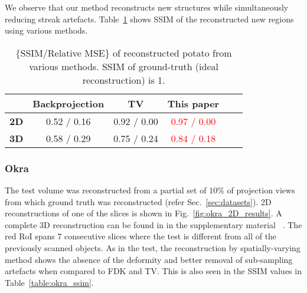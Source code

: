 \documentclass[journal]{IEEEtran}
\begin{document}
We observe
that our method reconstructs new structures while simultaneously
reducing streak artefacts. Table~\ref{table:potato_ssim} shows SSIM of
the reconstructed new regions using various methods.
\begin{comment}
\begin{figure}[!h]
\centering
\subcaptionbox{Test}{\fcolorbox{blue}{blue}{\texttt{[image: ../images/potato/post\_tci/6\_views/test\_zoomed.png]}}}
\subcaptionbox{FDK, no prior}{\texttt{[image: ../images/potato/post\_tci/6\_views/fbp\_zoomed.png]}}
\subcaptionbox{TV, no prior}{\texttt{[image: ../images/potato/post\_tci/6\_views/tv\_zoomed.png]}}
\subcaptionbox{This paper}{\texttt{[image: ../images/potato/post\_tci/6\_views/weighted\_pca\_zoomed.png]}}
\caption{A zoomed-in version of the regions around the RoI of the reconstructions shown in Fig.~\ref{fig:potato_2D_results}.}
\label{fig:potato_zoomed_2D_results}
\end{figure}
\end{comment}
\begin{table}[!h]
  \centering
  \caption{\{SSIM/Relative MSE\} of reconstructed potato from various
    methods. SSIM of ground-truth (ideal reconstruction) is 1.}
\begin{tabular}{|l|c|c|c|c|c|}
\hline &
\textbf{Backprojection} & \textbf{TV} &
\textbf{This paper} \\ \hline \textbf{2D} & 0.52 / 0.16
& 0.92 / 0.00 & \textcolor{red}{0.97 / 0.00} \\ \hline \textbf{3D} & 0.58 / 0.29 & 0.75 / 0.24 & \textcolor{red}{0.84 / 0.18}
\\ \hline
\end{tabular}
\label{table:potato_ssim}
\end{table}

\subsubsection{\textbf{Okra}}
\label{Sec:okra_spatially_varying}
The test volume was reconstructed from a partial set of $10\%$ of projection views from which
ground truth was reconstructed (refer Sec.~\ref{sec:datasets}). 2D reconstructions of one of the
slices is shown in Fig.~\ref{fig:okra_2D_results}. A complete 3D
reconstruction can be found in in the supplementary material
~\cite{supp_paper}. The red RoI spans 7 consecutive slices where the
test is different from all of the previously scanned objects. %
As in the test, the
reconstruction by spatially-varying method shows the absence of the
deformity and better removal of sub-sampling artefacts when compared
to FDK and TV. This is also seen in the SSIM values in
Table~\ref{table:okra_ssim}.
\end{document}
